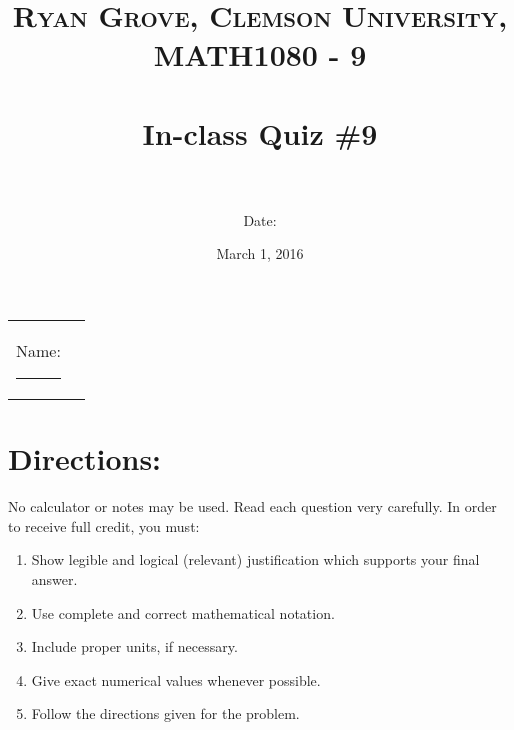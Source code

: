 \documentclass[paper=a4, fontsize=11pt]{scrartcl} %
\title{	
\normalfont \normalsize 
\textsc{Ryan Grove, Clemson University, MATH1080 - 9} \\ [25pt] %
\horrule{0.5pt} \\[0.4cm] %
\huge In-class Quiz \#9 \\ %
\horrule{2pt} \\[0.5cm] %
}
\author{Date:} %
\date{\normalsize March 1, 2016} %
\numberwithin{equation}{section} %
\numberwithin{figure}{section} %
\numberwithin{table}{section} %
\begin{document}
\maketitle %

\begin{flushleft}
\begin{tabular}{l l}
Name: \rule{3.2in}{.01cm}  & {}%
\end{tabular}
\end{flushleft}


\section*{\textbf{Directions:}}

No calculator or notes may be used.  Read each question very carefully.  In order to receive full credit, you must:
\begin{enumerate}
\item Show legible and logical (relevant) justification which supports your final answer.
\item Use complete and correct mathematical notation.
\item Include proper units, if necessary.
\item Give exact numerical values whenever possible.
\item Follow the directions given for the problem.
\end{enumerate}
\vspace{.1in}

\newpage
\end{document}
